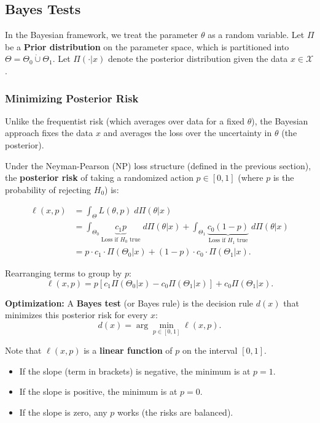\subsection{Bayes Tests}
\label{sec:bayes_tests}

In the Bayesian framework, we treat the parameter $\theta$ as a random variable.
Let $\Pi$ be a \textbf{Prior distribution} on the parameter space, which is partitioned into $\Theta = \Theta_0 \dot{\cup} \Theta_1$. Let $\Pi(\cdot|x)$ denote the posterior distribution given the data $x \in \mathcal{X}$.

\subsubsection{Minimizing Posterior Risk}
Unlike the frequentist risk (which averages over data for a fixed $\theta$), the Bayesian approach fixes the data $x$ and averages the loss over the uncertainty in $\theta$ (the posterior).



Under the Neyman-Pearson (NP) loss structure (defined in the previous section), the \textbf{posterior risk} of taking a randomized action $p \in [0, 1]$ (where $p$ is the probability of rejecting $H_0$) is:

\[
\begin{split} 
\ell(x,p) &= \int_{\Theta} L(\theta,p) \; d\Pi(\theta|x) \\ 
&= \int_{\Theta_0} \underbrace{c_1 p}_{\text{Loss if } H_0 \text{ true}} \; d\Pi(\theta|x) + \int_{\Theta_1} \underbrace{c_0 (1-p)}_{\text{Loss if } H_1 \text{ true}} \; d\Pi(\theta|x) \\ 
&= p \cdot c_1 \cdot \Pi(\Theta_0|x) + (1-p) \cdot c_0 \cdot \Pi(\Theta_1|x).
\end{split}
\]

Rearranging terms to group by $p$:
\[
\ell(x,p) = p \left[ c_1 \Pi(\Theta_0|x) - c_0 \Pi(\Theta_1|x) \right] + c_0 \Pi(\Theta_1|x).
\]

\textbf{Optimization:}
A \textbf{Bayes test} (or Bayes rule) is the decision rule $d(x)$ that minimizes this posterior risk for every $x$:
\[ d(x) = \arg\min_{p \in [0,1]} \ell(x, p). \]

Note that $\ell(x, p)$ is a \textbf{linear function} of $p$ on the interval $[0,1]$.
\begin{itemize}
    \item If the slope (term in brackets) is negative, the minimum is at $p=1$.
    \item If the slope is positive, the minimum is at $p=0$.
    \item If the slope is zero, any $p$ works (the risks are balanced).
\end{itemize}



